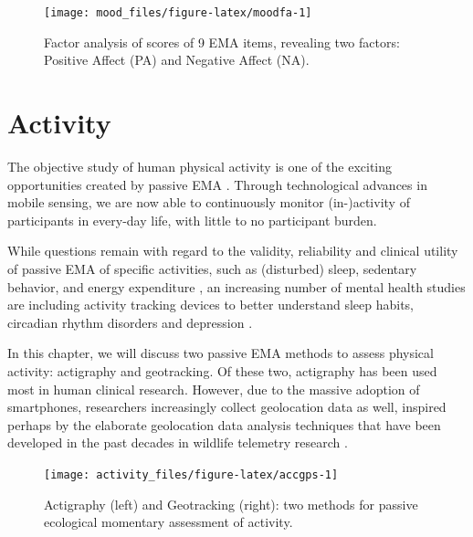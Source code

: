 \documentclass[]{book}
\begin{document}
\begin{figure}

{\centering \texttt{[image: mood\_files/figure-latex/moodfa-1]} 

}

\caption{Factor analysis of scores of 9 EMA items, revealing two factors:  Positive Affect (PA) and Negative Affect (NA).}\label{fig:moodfa}
\end{figure}

\chapter{Activity}\label{activity}

  

The objective study of human physical activity is one of the exciting
opportunities created by passive EMA \citep{Marszalek2014}. Through
technological advances in mobile sensing, we are now able to
continuously monitor (in-)activity of participants in every-day life,
with little to no participant burden.

While questions remain with regard to the validity, reliability and
clinical utility of passive EMA of specific activities, such as
(disturbed) sleep, sedentary behavior, and energy expenditure
\citep[see, e.g.,][]{Feehan2018, Gomersall2016}, an increasing number of
mental health studies are including activity tracking devices to better
understand sleep habits, circadian rhythm disorders and depression
\citep[see, e.g.,][]{Cornet2017, Saeb2015, Saunders2016, Tahmasian2013}.

In this chapter, we will discuss two passive EMA methods to assess
physical activity: actigraphy and geotracking. Of these two, actigraphy
has been used most in human clinical research. However, due to the
massive adoption of smartphones, researchers increasingly collect
geolocation data as well, inspired perhaps by the elaborate geolocation
data analysis techniques that have been developed in the past decades in
wildlife telemetry research \citep{tomkiewicz2010global}.

\begin{figure}

{\centering \texttt{[image: activity\_files/figure-latex/accgps-1]} 

}

\caption{Actigraphy (left) and Geotracking (right): two methods for passive ecological momentary assessment of activity.}\label{fig:accgps}
\end{figure}
\end{document}
